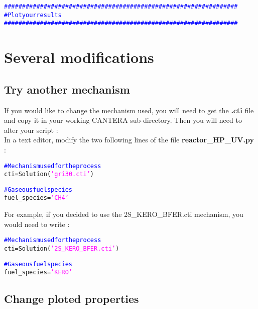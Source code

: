 \documentclass[a4paper,11pt]{article}
\begin{document}
\begin{alltt}
\textcolor{blue}{#################################################################
# Plot your results
#################################################################}
\end{alltt}
\bigskip


\section{Several modifications}
\bigskip

\subsection{Try another mechanism}
\bigskip

If you would like to change the mechanism used, you will need to get the \textbf{.cti} file and copy it in your working CANTERA sub-directory. Then you will need to alter your script : \\

In a text editor, modify the two following lines of the file \textbf{reactor\_HP\_UV.py} : \\   

\begin{alltt}
\textcolor{blue}{#Mechanism used for the process}
cti = Solution(\textcolor{magenta}{'gri30.cti'})

\textcolor{blue}{#Gaseous fuel species}
fuel_species = \textcolor{magenta}{'CH4'}
\end{alltt}
\bigskip

For example, if you decided to use the 2S\_KERO\_BFER.cti mechanism, you would need to write : \\

\begin{alltt}
\textcolor{blue}{#Mechanism used for the process}
cti = Solution(\textcolor{magenta}{'2S\_KERO\_BFER.cti'})

\textcolor{blue}{#Gaseous fuel species}
fuel_species = \textcolor{magenta}{'KERO'}
\end{alltt}
\bigskip


\subsection{Change ploted properties}
\bigskip
\end{document}
